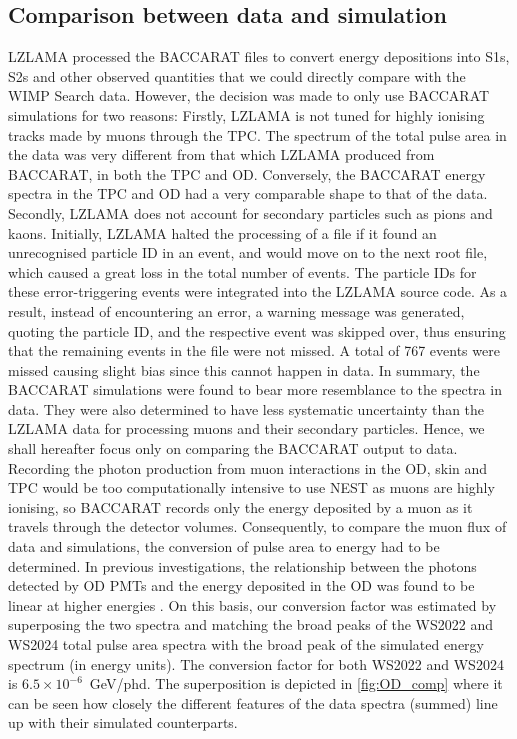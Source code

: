 \subsection{Comparison between data and simulation}
LZLAMA processed the BACCARAT files to convert energy depositions into S1s, S2s and other observed quantities that we could directly compare with the WIMP Search data. However, the decision was made to only use BACCARAT simulations for two reasons: Firstly, LZLAMA is not tuned for highly ionising tracks made by muons through the TPC. The spectrum of the total pulse area in the data was very different from that which LZLAMA produced from BACCARAT, in both the TPC and OD. Conversely, the BACCARAT energy spectra in the TPC and OD had a very comparable shape to that of the data. Secondly, LZLAMA does not account for secondary particles such as pions and kaons. Initially, LZLAMA halted the processing of a file if it found an unrecognised particle ID in an event, and would move on to the next root file, which caused a great loss in the total number of events. The particle IDs for these error-triggering events were integrated into the LZLAMA source code. As a result, instead of encountering an error, a warning message was generated, quoting the particle ID, and the respective event was skipped over, thus ensuring that the remaining events in the file were not missed. A total of 767 events were missed causing slight bias since this cannot happen in data. In summary, the BACCARAT simulations were found to bear more resemblance to the spectra in data. They were also determined to have less systematic uncertainty than the LZLAMA data for processing muons and their secondary particles. Hence, we shall hereafter focus only on comparing the BACCARAT output to data. \\

Recording the photon production from muon interactions in the OD, skin and TPC would be too computationally intensive to use NEST as muons are highly ionising, so BACCARAT records only the energy deposited by a muon as it travels through the detector volumes. Consequently, to compare the muon flux of data and simulations, the conversion of pulse area to energy had to be determined. In previous investigations, the relationship between the photons detected by OD PMTs and the energy deposited in the OD was found to be linear at higher energies \cite{OD_linear}. On this basis, our conversion factor was estimated by superposing the two spectra and matching the broad peaks of the WS2022 and WS2024 total pulse area spectra with the broad peak of the simulated energy spectrum (in energy units). The conversion factor for both WS2022 and WS2024 is $6.5\times10^{-6}$~GeV/phd. The superposition is depicted in \autoref{fig:OD_comp} where it can be seen how closely the different features of the data spectra (summed) line up with their simulated counterparts.

